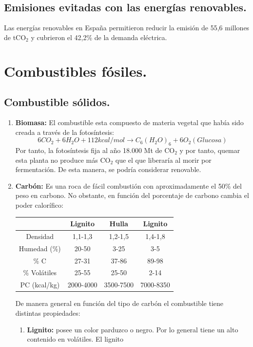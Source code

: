 \subsection{Emisiones evitadas con las energías renovables.}
Las energías renovables en España permitieron reducir la emisión de 55,6 millones de tCO$_2$ y cubrieron el 42,2\% de la demanda eléctrica.
\newpage
\section{Combustibles fósiles.}
\subsection{Combustible sólidos.}
\begin{enumerate}
	\item \textbf{Biomasa:}
		El combustible esta compuesto de materia vegetal que había sido creada a través de la fotosíntesis:
		\[6 CO_2 + 6 H_2O + 112 kcal/mol \rightarrow C_6 (H_2O)_6 + 6 O_2 ( Glucosa)\]
		Por tanto, la fotosíntesis fija al año 18.000 Mt de CO$_2$ y por tanto, quemar esta planta no produce más CO$_2$ que el que liberaría al morir por fermentación. De esta manera, se podría considerar renovable.
	\item \textbf{Carbón:}
		Es una roca de fácil combustión con aproximadamente el 50\% del peso en carbono. No obstante, en función del porcentaje de carbono cambia el poder calorífico:
		\begin{table}[H]
			\centering
			\renewcommand{\arraystretch}{1.1}
			\begin{tabular}{cccc}
				\hline
				&\textbf{Lignito} & \textbf{Hulla} & \textbf{Lignito}\\  
				\hline
			Densidad &  1,1-1,3&1,2-1,5  &1,4-1,8\\ 
			Humedad (\%) &20-50  &3-25  &3-5\\ 
			\% C & 27-31 &  37-86&89-98\\ 
			\% Volátiles &25-55  &25-50  &2-14\\ 
			PC (kcal/kg) &  2000-4000&3500-7500  &7000-8350\\ 
				\hline
			\end{tabular}
		\end{table}
		De manera general en función del tipo de carbón el combustible tiene distintas propiedades:
		\begin{enumerate}
			\item \textbf{Lignito:}
			posee un color parduzco o negro. Por lo general tiene un alto contenido en volátiles. El lignito

\end{enumerate}
\end{enumerate}
